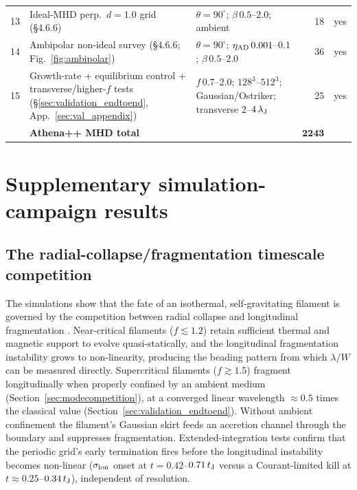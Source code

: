 \documentclass[usenatbib,twoside,twocolumn]{mnras}
\begin{document}
\begin{table}
\begin{tabular}{cllrl}
13 & Ideal-MHD perp.\ $d=1.0$ grid (\S4.6.6) & $\theta=90^\circ$; $\beta\,0.5$--$2.0$; ambient & 18 & yes \\
14 & Ambipolar non-ideal survey (\S4.6.6; Fig.~\ref{fig:ambipolar}) & $\theta=90^\circ$; $\eta_{\rm AD}\,0.001$--$0.1$; $\beta\,0.5$--$2.0$ & 36 & yes \\
15 & Growth-rate + equilibrium control + transverse/higher-$f$ tests (\S\ref{sec:validation_endtoend}, App.~\ref{sec:val_appendix}) & $f\,0.7$--$2.0$; $128^3$--$512^3$; Gaussian/Ostriker; transverse $2$--$4\,\lambda_{\rm J}$ & 25 & yes \\
\midrule
   & \textbf{Athena++ MHD total} & & $\boldsymbol{2243}$ & \\
\bottomrule
\end{tabular}
\end{table}


\section{Supplementary simulation-campaign results}
\label{sec:supplementary_campaigns_app}

\subsection{The radial-collapse/fragmentation timescale competition}
\label{sec:regimes}

The simulations show that the fate of an isothermal, self-gravitating filament is governed by the competition between radial collapse and longitudinal fragmentation \citep{Inutsuka1997, Pon2012}. Near-critical filaments ($f\lesssim1.2$) retain sufficient thermal and magnetic support to evolve quasi-statically, and the longitudinal fragmentation instability grows to non-linearity, producing the beading pattern from which $\lambda/W$ can be measured directly. Supercritical filaments ($f\gtrsim1.5$) fragment longitudinally when properly confined by an ambient medium (Section~\ref{sec:modecompetition}), at a converged linear wavelength $\approx0.5$ times the classical value (Section~\ref{sec:validation_endtoend}). Without ambient confinement the filament's Gaussian skirt feeds an accretion channel through the boundary and suppresses fragmentation. Extended-integration tests confirm that the periodic grid's early termination fires before the longitudinal instability becomes non-linear ($\sigma_{\rm lon}$ onset at $t=0.42$--$0.71\,t_{\rm J}$ versus a Courant-limited kill at $t\approx0.25$--$0.34\,t_{\rm J}$), independent of resolution.
\end{document}
